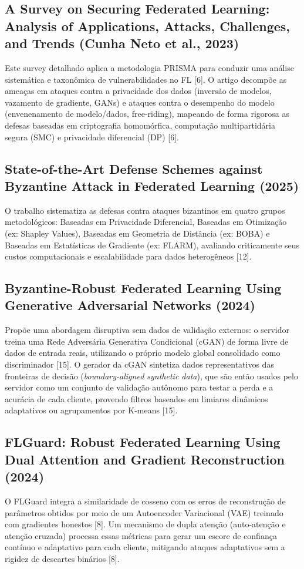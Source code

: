 \documentclass[11pt,a4paper]{article}
\begin{document}
\subsection{A Survey on Securing Federated Learning: Analysis of Applications, Attacks, Challenges, and Trends (Cunha Neto et al., 2023)}
Este survey detalhado aplica a metodologia PRISMA para conduzir uma análise sistemática e taxonômica de vulnerabilidades no FL [6]. O artigo decompõe as ameaças em ataques contra a privacidade dos dados (inversão de modelos, vazamento de gradiente, GANs) e ataques contra o desempenho do modelo (envenenamento de modelo/dados, free-riding), mapeando de forma rigorosa as defesas baseadas em criptografia homomórfica, computação multipartidária segura (SMC) e privacidade diferencial (DP) [6].

\subsection{State-of-the-Art Defense Schemes against Byzantine Attack in Federated Learning (2025)}
O trabalho sistematiza as defesas contra ataques bizantinos em quatro grupos metodológicos: Baseadas em Privacidade Diferencial, Baseadas em Otimização (ex: Shapley Values), Baseadas em Geometria de Distância (ex: BOBA) e Baseadas em Estatísticas de Gradiente (ex: FLARM), avaliando criticamente seus custos computacionais e escalabilidade para dados heterogêneos [12].

\subsection{Byzantine-Robust Federated Learning Using Generative Adversarial Networks (2024)}
Propõe uma abordagem disruptiva sem dados de validação externos: o servidor treina uma Rede Adversária Generativa Condicional (cGAN) de forma livre de dados de entrada reais, utilizando o próprio modelo global consolidado como discriminador [15]. O gerador da cGAN sintetiza dados representativos das fronteiras de decisão (\textit{boundary-aligned synthetic data}), que são então usados pelo servidor como um conjunto de validação autônomo para testar a perda e a acurácia de cada cliente, provendo filtros baseados em limiares dinâmicos adaptativos ou agrupamentos por K-means [15].

\subsection{FLGuard: Robust Federated Learning Using Dual Attention and Gradient Reconstruction (2024)}
O FLGuard integra a similaridade de cosseno com os erros de reconstrução de parâmetros obtidos por meio de um Autoencoder Variacional (VAE) treinado com gradientes honestos [8]. Um mecanismo de dupla atenção (auto-atenção e atenção cruzada) processa essas métricas para gerar um escore de confiança contínuo e adaptativo para cada cliente, mitigando ataques adaptativos sem a rigidez de descartes binários [8].
\end{document}
